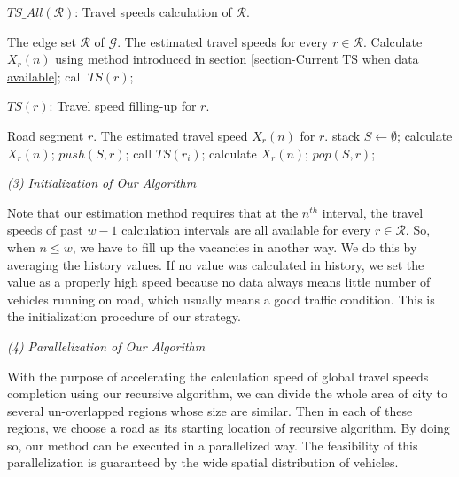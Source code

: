 \documentclass[twocolumn,10pt,final,conference]{IEEEtran}
\begin{document}
\begin{algorithm}[h]
\small
\caption{$TS\_All(\mathcal{R})$: Travel speeds calculation of $\mathcal{R}$.}
\label{alg-current travel speeds filling-up for big R.}
\begin{algorithmic}
\REQUIRE The edge set $\mathcal{R}$ of $\mathcal{G}$.
\ENSURE  The estimated travel speeds  for every $r \in \mathcal{R}$.
 \STATE Calculate $X_{r}(n)$ using method introduced in section \ref{section-Current TS when data available};
 \ELSE
 \STATE call $TS(r)$;
 \ENDIF
\ENDIF
\ENDFOR
\end{algorithmic}
\end{algorithm}

\begin{algorithm}[h]
\small
\caption{$TS(r)$: Travel speed filling-up for $r$.}
\label{alg-current travel speeds filling-up for r.}
\begin{algorithmic}
\REQUIRE Road segment $r$.
\ENSURE  The estimated travel speed $X_{r}(n)$ for $r$.
\STATE stack $S\leftarrow \emptyset$;
\STATE calculate $X_{r}(n)$;
\ELSE
\STATE $push(S, r) $;
\STATE call $TS(r_i)$;
\ENDFOR
\STATE calculate $X_{r}(n)$;
\STATE $pop(S, r)$;
\ENDIF
\end{algorithmic}
\end{algorithm}
\emph{(3) Initialization of Our Algorithm}
\quad

Note that our estimation method requires that at the $n^{th}$ interval, the travel speeds of past $w-1$ calculation intervals are all available for every $r \in \mathcal{R}$. So, when $n\leq w$, we have to fill up the vacancies in another way. We do this by averaging the history values. If no value was calculated in history, we set the value as a properly high speed because no data always means little number of vehicles running on road, which usually means a good traffic condition. This is the initialization procedure of our strategy.

\emph{(4) Parallelization of Our Algorithm}
\quad

With the purpose of accelerating the calculation speed of global travel speeds completion using our recursive algorithm, we can divide the whole area of city to several un-overlapped regions whose size are similar. Then in each of these regions, we choose a road as its starting location of recursive algorithm. By doing so, our method can be executed  in a parallelized way. The feasibility of this parallelization is guaranteed by the wide spatial distribution of vehicles.
\end{document}
